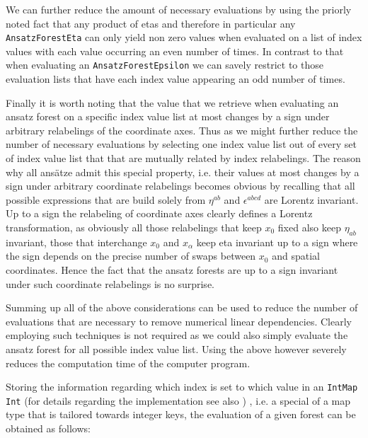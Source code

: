 \documentclass[a4paper,12pt, DIV=14, BCOR=5mm, twoside, headsepline]{scrbook}
\begin{document}
We can further reduce the amount of necessary evaluations by using the priorly noted fact that any product of etas and therefore in particular any \texttt{AnsatzForestEta} can only yield non zero values when evaluated on a list of index values with each value occurring an even number of times. In contrast to that when evaluating an \texttt{AnsatzForestEpsilon} we can savely restrict to those evaluation lists that have each index value appearing an odd number of times.

Finally it is worth noting that the value that we retrieve when evaluating an ansatz forest on a specific index value list at most changes by a sign under arbitrary relabelings of the coordinate axes. Thus as we might further reduce the number of necessary evaluations by selecting one index value list out of every set of index value list that that are mutually related by index relabelings. The reason why all ansätze admit this special property, i.e. their values at most changes by a sign under arbitrary coordinate relabelings becomes obvious by recalling that all possible expressions that are build solely from $\eta^{ab}$ and $\epsilon^{abcd}$ are Lorentz invariant. Up to a sign the relabeling of coordinate axes clearly defines a Lorentz transformation, as obviously all those relabelings that keep $x_0$ fixed also keep $\eta_{ab}$ invariant, those that interchange $x_0$ and $x_{\alpha}$ keep eta invariant up to a sign where the sign depends on the precise number of swaps between $x_0$ and spatial coordinates. Hence the fact that the ansatz forests are up to a sign invariant under such coordinate relabelings is no surprise. 

Summing up all of the above considerations can be used to reduce the number of evaluations that are necessary to remove numerical linear dependencies. Clearly employing such techniques is not required as we could also simply evaluate the ansatz forest for all possible index value list. Using the above however severely reduces the computation time of the computer program. 

Storing the information regarding which index is set to which value in an \texttt{IntMap Int} \cite{HackageIntMap} (for details regarding the implementation see also \cite{Okasaki98fastmergeable}) , i.e. a special of a map type that is tailored towards integer keys, the evaluation of a given forest can be obtained as follows: 
\end{document}
